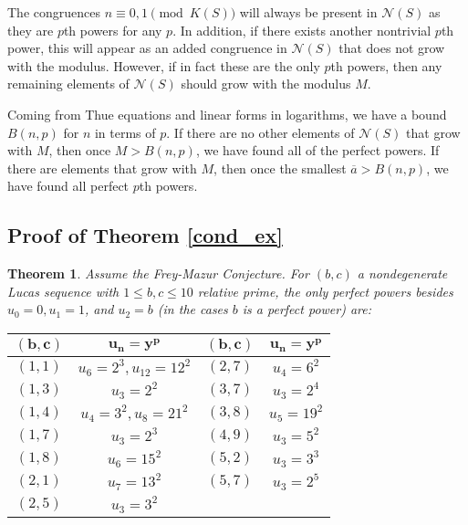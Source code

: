\documentclass[12pt]{amsart}
\newtheorem{thm}{Theorem}[section]
\theoremstyle{definition}
\def\N{{\mathcal N}}
\renewcommand{\bar}{\overline}
\begin{document}
The congruences $n \equiv 0,1 \pmod{K(S)}$ will always be present in $\N(S)$ as they are $p$th powers for any $p$.  In addition, if there exists another nontrivial $p$th power, this will appear as an added congruence in $\N(S)$ that does not grow with the modulus.  However, if in fact these are the only $p$th powers, then any remaining elements of $\N(S)$ should grow with the modulus $M$.  

Coming from Thue equations and linear forms in logarithms, we have a bound $B(n,p)$ for $n$ in terms of $p$.  If there are no other elements of $\N(S)$ that grow with $M$, then once $M >B(n,p)$, we have found all of the perfect powers.  If there are elements that grow with $M$, then once the smallest $\bar{a} > B(n,p)$, we have found all perfect $p$th powers.






\subsection{Proof of Theorem \ref{cond_ex}}

\begin{thm}\label{cond_ex_inplace}
Assume the Frey-Mazur Conjecture.  For $(b,c)$ a nondegenerate Lucas sequence with $1 \leq b,c \leq 10$ relative prime, the only perfect powers besides $u_0=0,u_1=1$, and $u_2 = b$ (in the cases $b$ is a perfect power) are:
\begin{center}
\begin{tabular}{c | c || c | c}
$\mathbf{(b,c)}$ & $\mathbf{u_n=y^p}$ & $\mathbf{(b,c)}$ & $\mathbf{u_n = y^p}$ \\ \hline
$(1,1)$ & $u_6 = 2^3, u_{12} = 12^2$ & $(2,7)$ & $u_4 = 6^2$ \\
$(1,3)$ & $u_3 = 2^2$ & $(3,7)$ & $u_3 = 2^4$ \\
$(1,4)$ & $u_4 = 3^2, u_8 = 21^2$ & $(3,8)$ & $u_5 = 19^2$ \\
$(1,7)$ & $u_3 = 2^3$ & $(4,9)$ & $u_3 = 5^2$ \\
$(1,8)$ & $u_6 = 15^2$ & $(5,2)$ & $u_3 = 3^3$ \\
$(2,1)$ &  $u_7 = 13^2$ & $(5,7)$ & $u_3 = 2^5$ \\
$(2,5)$ & $u_3 = 3^2$ \\
\end{tabular}
\end{center}
\end{thm}







{}

\end{document}
